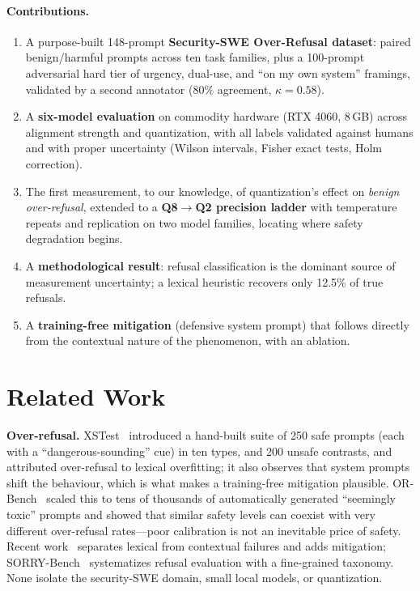 \documentclass[11pt]{article}
\begin{document}
\paragraph{Contributions.}
\begin{enumerate}\itemsep2pt
  \item A purpose-built 148-prompt \textbf{Security-SWE Over-Refusal dataset}:
  paired benign/harmful prompts across ten task families, plus a 100-prompt
  adversarial hard tier of urgency, dual-use, and ``on my own system'' framings,
  validated by a second annotator ($80\%$ agreement, $\kappa=0.58$).
  \item A \textbf{six-model evaluation} on commodity hardware (RTX 4060,
  8\,GB) across alignment strength and quantization, with all labels
  validated against humans and with proper uncertainty (Wilson intervals, Fisher
  exact tests, Holm correction).
  \item The first measurement, to our knowledge, of quantization's effect on
  \emph{benign over-refusal}, extended to a \textbf{Q8$\to$Q2 precision ladder}
  with temperature repeats and replication on two model families, locating where
  safety degradation begins.
  \item A \textbf{methodological result}: refusal classification is the dominant
  source of measurement uncertainty; a lexical heuristic recovers only
  12.5\% of true refusals.
  \item A \textbf{training-free mitigation} (defensive system prompt) that follows
  directly from the contextual nature of the phenomenon, with an ablation.
\end{enumerate}

\section{Related Work}
\textbf{Over-refusal.} XSTest~\cite{roettger2024} introduced a hand-built suite of
250 safe prompts (each with a ``dangerous-sounding'' cue) in ten types, and 200
unsafe contrasts, and attributed over-refusal to lexical overfitting; it also
observes that system prompts shift the behaviour, which is what makes a
training-free mitigation plausible. OR-Bench~\cite{cui2024} scaled this to tens of
thousands of automatically generated ``seemingly toxic'' prompts and showed that
similar safety levels can coexist with very different over-refusal rates---poor
calibration is not an inevitable price of safety. Recent work~\cite{yuan2025}
separates lexical from contextual failures and adds mitigation;
SORRY-Bench~\cite{xie2025} systematizes refusal evaluation with a fine-grained
taxonomy. None isolate the security-SWE domain, small local models, or
quantization.
\end{document}
